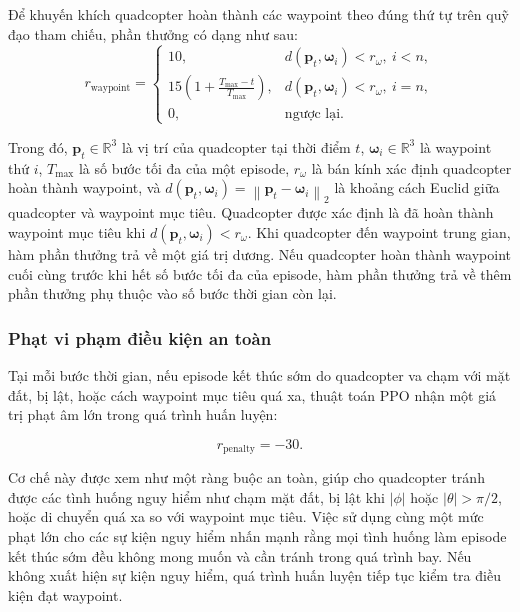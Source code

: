 Để khuyến khích quadcopter hoàn thành các waypoint theo đúng thứ tự trên quỹ đạo tham chiếu, phần thưởng có dạng như sau:
\begin{equation}
 r_{\mathrm{waypoint}} =\!
 \begin{cases}
  10, & d(\mathbf{p}_t, \boldsymbol{\omega}_i) < r_{\omega},\ i < n,\\[4pt]
  15\left(1 + \displaystyle\frac{T_{\max}-t}{T_{\max}}\right),
      & d(\mathbf{p}_t, \boldsymbol{\omega}_i) < r_{\omega},\ i = n,\\[8pt]
  0, & \text{ngược lại}.
 \end{cases}
 \label{eq:waypoint-reward}
\end{equation}

Trong đó, $\mathbf{p}_t \in \mathbb{R}^3$ là vị trí của quadcopter tại thời điểm $t$, $\boldsymbol{\omega}_i \in \mathbb{R}^3$ là waypoint thứ $i$, $T_{\max}$ là số bước tối đa của một episode, $r_{\omega}$ là bán kính xác định quadcopter hoàn thành waypoint, và
$d(\mathbf{p}_t, \boldsymbol{\omega}_i)= \left\|\mathbf{p}_t - \boldsymbol{\omega}_i\right\|_2$
là khoảng cách Euclid giữa quadcopter và waypoint mục tiêu. Quadcopter được xác định là đã hoàn thành waypoint mục tiêu khi $d(\mathbf{p}_t, \boldsymbol{\omega}_i) < r_{\omega}$. Khi quadcopter đến waypoint trung gian, hàm phần thưởng trả về một giá trị dương. Nếu quadcopter hoàn thành waypoint cuối cùng trước khi hết số bước tối đa của episode, hàm phần thưởng trả về thêm phần thưởng phụ thuộc vào số bước thời gian còn lại.

\subsubsection{Phạt vi phạm điều kiện an toàn}

Tại mỗi bước thời gian, nếu episode kết thúc sớm do quadcopter va chạm với mặt đất, bị lật, hoặc cách waypoint mục tiêu quá xa, thuật toán PPO nhận một giá trị phạt âm lớn trong quá trình huấn luyện:

\begin{equation}
    r_{\mathrm{penalty}} = -30.
    \label{eq:safety-penalty}
\end{equation}

Cơ chế này được xem như một ràng buộc an toàn, giúp cho quadcopter tránh được các tình huống nguy hiểm như chạm mặt đất, bị lật khi $|\phi|$ hoặc $|\theta| > \pi/2$, hoặc di chuyển quá xa so với waypoint mục tiêu. 
Việc sử dụng cùng một mức phạt lớn cho các sự kiện nguy hiểm nhấn mạnh rằng mọi tình huống làm episode kết thúc sớm đều không mong muốn và cần tránh trong quá trình bay. Nếu không xuất hiện sự kiện nguy hiểm, quá trình huấn luyện tiếp tục kiểm tra điều kiện đạt waypoint.

